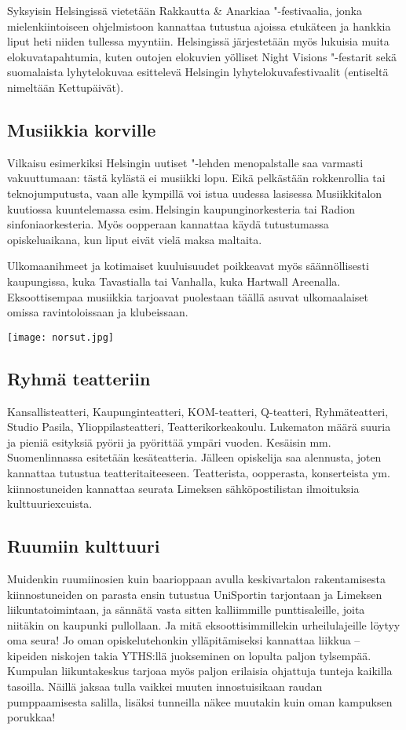 \documentclass[../ala_hataile.tex]{subfiles}
\begin{document}
Syksyisin Helsingissä vietetään Rakkautta
\& Anarkiaa "-festivaalia, jonka
mielenkiintoiseen ohjelmistoon kannattaa
tutustua ajoissa etukäteen ja hankkia liput
heti niiden tullessa myyntiin. Helsingissä
järjestetään myös lukuisia muita elokuvatapahtumia,
kuten outojen elokuvien yölliset
Night Visions "-festarit sekä suomalaista
lyhyt\-elokuvaa esittelevä Helsingin lyhyt\-elokuva\-festivaalit
(entiseltä nimeltään Kettupäivät).
\subsection*{Musiikkia korville}
Vilkaisu esimerkiksi Helsingin uutiset
"-lehden menopalstalle saa varmasti vakuuttumaan:
tästä kylästä ei musiikki lopu. Eikä
pelkästään rokkenrollia tai teknojumputusta,
vaan alle kympillä voi istua uudessa
lasisessa Musiikkitalon kuutiossa kuuntelemassa
esim.\,Helsingin kaupungin\-orkesteria tai Radion sinfoniaorkesteria. Myös oopperaan kannattaa käydä tutustumassa
opiskeluaikana, kun liput eivät vielä maksa
maltaita.

Ulkomaanihmeet ja kotimaiset kuuluisuudet
poikkeavat myös säännöllisesti
kaupungissa, kuka Tavastialla tai Vanhalla,
kuka Hartwall Areenalla. Eksoottisempaa
musiikkia tarjoavat puolestaan täällä asuvat
ulkomaalaiset omissa ravintoloissaan ja
klubeissaan.
\begin{figure*}[!b]
	\centering
	\texttt{[image: norsut.jpg]}
\end{figure*}
\subsection*{Ryhmä teatteriin}
Kansallisteatteri, Kaupungin\-teatteri,
KOM-teatteri, Q-teatteri, Ryhmä\-teatteri,
Studio Pasila, Yli\-oppilas\-teatteri, Teatteri\-korkea\-koulu.
Lukematon määrä suuria ja
pieniä esityksiä pyörii ja pyörittää ympäri
vuoden. Kesäisin mm.\,Suomenlinnassa
esitetään
kesäteatteria. Jälleen opiskelija
saa alennusta, joten kannattaa tutustua
teatteritaiteeseen.
Teatterista, oopperasta,
konserteista
ym.\,kiinnostuneiden kannattaa
seurata Limeksen sähköpostilistan ilmoituksia
kulttuuriexcuista.
\subsection*{Ruumiin kulttuuri}
Muidenkin ruumiinosien kuin baarioppaan
avulla keskivartalon rakentamisesta
kiinnostuneiden on parasta ensin tutustua
UniSportin tarjontaan ja Limeksen liikuntatoimintaan,
ja sännätä vasta sitten
kalliimmille punttisaleille, joita niitäkin
on kaupunki pullollaan. Ja mitä eksoottisimmillekin
urheilulajeille löytyy oma
seura! Jo oman opiskelutehonkin ylläpitämiseksi
kannattaa liikkua -- kipeiden niskojen
takia YTHS:llä juokseminen on lopulta
paljon tylsempää. Kumpulan liikuntakeskus
tarjoaa myös paljon erilaisia ohjattuja
tunteja kaikilla tasoilla. Näillä jaksaa tulla
vaikkei muuten innostuisikaan raudan
pumppaamisesta
salilla, lisäksi tunneilla
näkee muutakin kuin oman kampuksen porukkaa!
\end{document}
